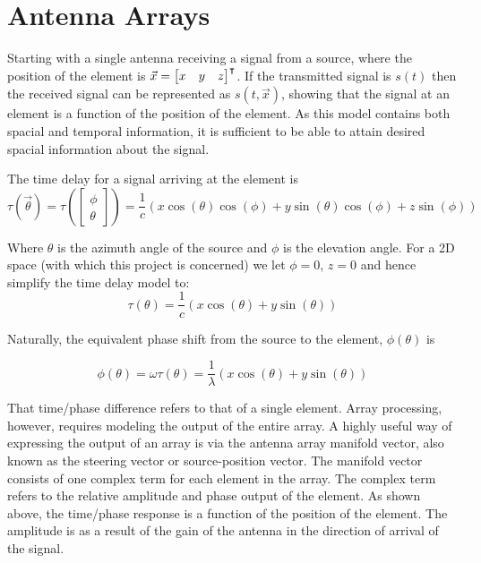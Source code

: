 \section{Antenna Arrays}

Starting with a single antenna receiving a signal from a source, where the position of the element is \(\vec{x} = \begin{bmatrix}x & y & z \end{bmatrix}^\intercal\). 
If the transmitted signal is \(s(t)\) then the received signal can be represented as \(s(t, \vec{x})\), showing that the signal at an element is a function of the position of the element.
As this model contains both spacial and temporal information, it is sufficient to be able to attain desired spacial information about the signal\cite{krim1996two}.

The time delay for a signal arriving at the element is \cite{poisel2012electronic}
\begin{equation}
  \tau(\vec{\theta}) 
 = \tau( \begin{bmatrix} \phi \\ \theta \end{bmatrix} )
 = \frac{1}{c} \left( x\cos(\theta)\cos(\phi) + y\sin(\theta)\cos(\phi) + z\sin(\phi) \right)
\end{equation}

Where \(\theta\) is the azimuth angle of the source and \(\phi\) is the elevation angle.
For a 2D space (with which this project is concerned) we let \(\phi= 0\), \(z = 0\) and hence simplify the time delay model to:
\begin{equation}
  \tau(\theta) = \frac{1}{c} \left( x\cos(\theta) + y\sin(\theta) \right)
\end{equation}

Naturally, the equivalent phase shift from the source to the element, \(\phi(\theta)\) is

\begin{equation}
  \phi(\theta) = \omega\tau(\theta) = \frac{1}{\lambda} \left( x\cos(\theta) + y\sin(\theta) \right)
\end{equation}

That time/phase difference refers to that of a single element. 
Array processing, however, requires modeling the output of the entire array. 
A highly useful way of expressing the output of an array is via the antenna array manifold vector, also known as the steering vector or source-position vector. 
The manifold vector consists of one complex term for each element in the array. 
The complex term refers to the relative amplitude and phase output of the element. 
As shown above, the time/phase response is a function of the position of the element. 
The amplitude is as a result of the gain of the antenna in the direction of arrival of the signal. 

